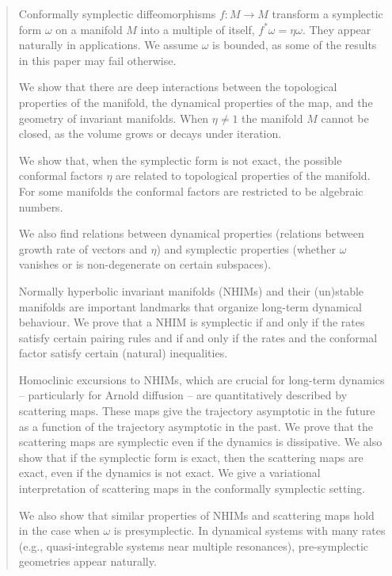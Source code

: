 \documentclass[11pt]{amsart}
\theoremstyle{definition}
\theoremstyle{remark}
\numberwithin{equation}{section}
\begin{document}
\begin{abstract}

Conformally symplectic  diffeomorphisms $f:M \rightarrow M$ transform a symplectic form $\omega$ on a  manifold $M$ into a multiple of itself, $f^* \omega = \eta \omega$. They appear  naturally in applications. We assume $\omega$ is bounded, as some of the results in this paper may fail otherwise.

We show that there are deep interactions between the topological properties of the manifold, the dynamical properties of the map, and the geometry of invariant manifolds. When $\eta \ne 1$  the manifold $M$  cannot be closed, as the volume grows or decays under  iteration.

We show   that,  when the symplectic form is not exact, the possible conformal factors $\eta$ are related to topological properties of the  manifold. For some manifolds the conformal factors are restricted to be algebraic numbers.

We also find relations between dynamical properties (relations between  growth rate of vectors and $\eta$) and symplectic properties (whether $\omega$ vanishes or is non-degenerate on certain subspaces).

Normally hyperbolic invariant manifolds (NHIMs) and their (un)stable manifolds are important landmarks that organize long-term dynamical behaviour.
We prove that a NHIM is symplectic if and only if the rates satisfy certain pairing rules and if and only if the rates and the conformal
factor satisfy certain (natural) inequalities.

Homoclinic excursions to NHIMs, which are crucial for long-term dynamics -- particularly for Arnold diffusion -- are quantitatively described by scattering maps. These maps give the trajectory asymptotic in the future as a function of the trajectory asymptotic in the past. We prove that the scattering maps are symplectic even if the dynamics is dissipative. We also show that if the symplectic form is exact, then the scattering maps are exact,
even if the dynamics is not exact. We  give a variational interpretation of scattering maps in  the conformally symplectic setting.

We also show that similar properties of NHIMs and scattering maps hold in the case when $\omega$ is presymplectic.
In dynamical systems with many rates (e.g., quasi-integrable systems near multiple resonances), pre-symplectic geometries appear naturally.

\end{abstract}
\maketitle
\end{document}

